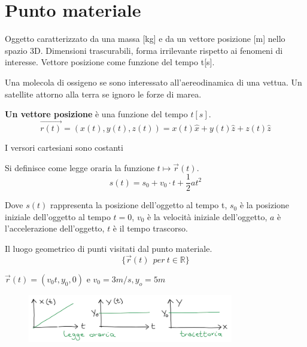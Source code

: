 \section{Punto materiale}
Oggetto caratterizzato da una massa [kg] e da un vettore posizione [m] nello spazio 3D.
Dimensioni trascurabili, forma irrilevante rispetto ai fenomeni di interesse.
Vettore posizione come funzione del tempo t[s].
\begin{example}
    Una molecola di ossigeno se sono interessato all'aereodinamica di una vettua. 
    Un satellite attorno alla terra se ignoro le forze di marea.
\end{example}
\hspace{-15pt}\textbf{Un vettore posizione} è una funzione del tempo $t[s]$.
$$\vec{r(t)} = (x(t), y(t), z(t)) = x(t)\hat{x} + y(t)\hat{z} + z(t)\hat{z}$$
\begin{observation}
    I versori cartesiani sono costanti
\end{observation}

\begin{definition}
    Si definisce come legge oraria la funzione $t \mapsto \vec{r}(t)$.
    $$s(t) = s_0 + v_0 \cdot t + \frac{1}{2}at^2$$
\end{definition}
\hspace{-15pt}Dove $s(t)$ rappresenta la posizione dell'oggetto al tempo t,  $s_0$ è la posizione iniziale dell'oggetto al tempo
$t=0$, $v_0$ è la velocità iniziale dell'oggetto, $a$ è l'accelerazione dell'oggetto, $t$ è il tempo trascorso.

\begin{definition}[Traiettoria]
    Il luogo geometrico di punti visitati dal punto materiale.
    $$\{\vec{r}(t)\:\: per \: t \in \mathbb{R}\}$$
\end{definition}

\begin{example}
    $\vec{r}(t) = (v_0t, y_0, 0)$ e $v_0 = 3m/s, y_o = 5m$ 
    \begin{figure}[h!]
        \centering
        \includegraphics[width=0.8\textwidth]{images/ess-traiettoria.png}
    \end{figure}
\end{example}

